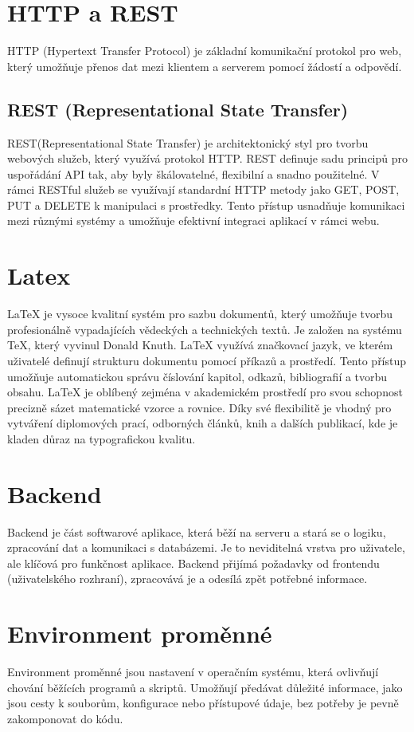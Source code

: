 \section{HTTP a REST}\label{sec:http-rest}
HTTP (Hypertext Transfer Protocol) je základní komunikační protokol pro web, který umožňuje přenos dat mezi klientem a serverem pomocí žádostí a odpovědí.

\subsection{REST (Representational State Transfer)}
REST(Representational State Transfer) je architektonický styl pro tvorbu webových služeb, který využívá protokol HTTP. REST definuje sadu principů pro uspořádání API tak, aby byly škálovatelné, flexibilní a snadno použitelné. V rámci RESTful služeb se využívají standardní HTTP metody jako GET, POST, PUT a DELETE k manipulaci s prostředky. Tento přístup usnadňuje komunikaci mezi různými systémy a umožňuje efektivní integraci aplikací v rámci webu.


\section{Latex}\label{sec:latex}
LaTeX je vysoce kvalitní systém pro sazbu dokumentů, který umožňuje tvorbu profesionálně vypadajících vědeckých a technických textů. Je založen na systému TeX, který vyvinul Donald Knuth. LaTeX využívá značkovací jazyk, ve kterém uživatelé definují strukturu dokumentu pomocí příkazů a prostředí. Tento přístup umožňuje automatickou správu číslování kapitol, odkazů, bibliografií a tvorbu obsahu. LaTeX je oblíbený zejména v akademickém prostředí pro svou schopnost precizně sázet matematické vzorce a rovnice. Díky své flexibilitě je vhodný pro vytváření diplomových prací, odborných článků, knih a dalších publikací, kde je kladen důraz na typografickou kvalitu.


\section{Backend}\label{sec:backend}
Backend je část softwarové aplikace, která běží na serveru a stará se o logiku, zpracování dat a komunikaci s databázemi. Je to neviditelná vrstva pro uživatele, ale klíčová pro funkčnost aplikace. Backend přijímá požadavky od frontendu (uživatelského rozhraní), zpracovává je a odesílá zpět potřebné informace.


\section{Environment proměnné}\label{sec:environment-variables}
Environment proměnné jsou nastavení v operačním systému, která ovlivňují chování běžících programů a skriptů. Umožňují předávat důležité informace, jako jsou cesty k souborům, konfigurace nebo přístupové údaje, bez potřeby je pevně zakomponovat do kódu.




